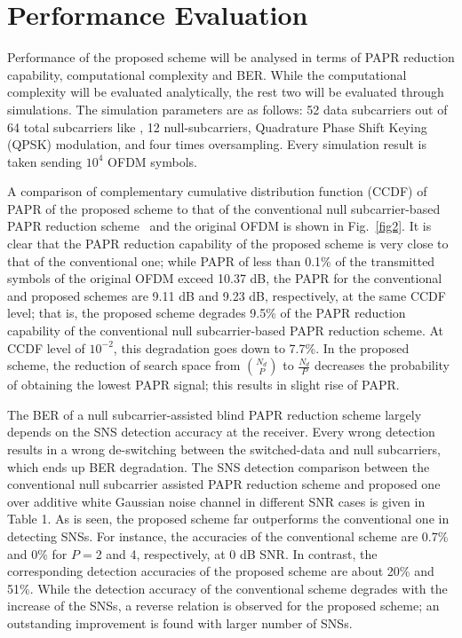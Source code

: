\documentclass[journal,comsoc]{IEEEtran}
\begin{document}
\section{Performance Evaluation}
Performance of the proposed scheme will be analysed in terms of PAPR reduction capability, computational complexity and BER. While the computational complexity will be evaluated analytically, the rest two will be evaluated through simulations. The simulation parameters are as follows: 52 data subcarriers out of 64 total subcarriers like \cite{sabbir3}, 12 null-subcarriers, Quadrature Phase Shift Keying (QPSK) modulation, and four times oversampling. Every simulation result is taken sending $10^4$ OFDM symbols.

   A comparison of complementary cumulative distribution function (CCDF) of PAPR of the proposed scheme to that of the conventional null subcarrier-based PAPR reduction scheme~\cite{wong1} and the original OFDM is shown in Fig.~\ref{fig2}. It is clear that the PAPR reduction capability of the proposed scheme is very close to that of the conventional one; while PAPR of less than 0.1\% of the transmitted symbols of the original OFDM exceed 10.37 dB, the PAPR for the conventional and proposed schemes are 9.11 dB and 9.23 dB, respectively, at the same CCDF level; that is, the proposed scheme degrades 9.5\% of the PAPR reduction capability of the conventional null subcarrier-based PAPR reduction scheme. At CCDF level of $10^{-2}$, this degradation goes down to 7.7\%. In the proposed scheme, the reduction of search space from $N_d \choose P$ to $\frac{N_d}{P}$ decreases the probability of obtaining the lowest PAPR signal; this results in slight rise of PAPR.

   The BER of a null subcarrier-assisted blind PAPR reduction scheme largely depends on the SNS detection accuracy at the receiver. Every wrong detection results in a wrong de-switching between the switched-data and null subcarriers, which ends up BER degradation. The SNS detection comparison between the conventional null subcarrier assisted PAPR reduction scheme and proposed one over additive white Gaussian noise channel in different SNR cases is given in Table 1. As is seen, the proposed scheme far outperforms the conventional one in detecting SNSs. For instance, the accuracies of the conventional scheme are 0.7\% and 0\% for $P=$2 and 4, respectively, at 0 dB SNR. In contrast, the corresponding detection accuracies of the proposed scheme are about 20\% and 51\%. While the detection accuracy of the conventional scheme degrades with the increase of the SNSs, a reverse relation is observed for the proposed scheme; an outstanding improvement is found with larger number of SNSs.
   
\end{document}
